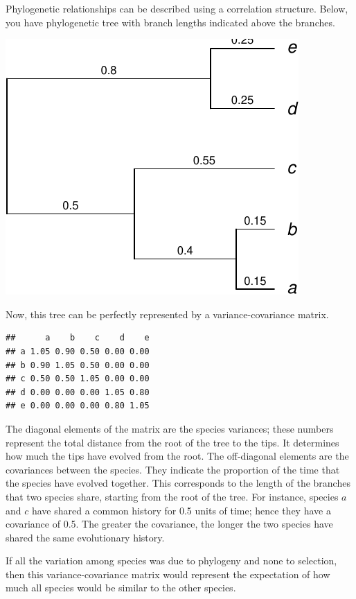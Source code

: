 \documentclass[
]{book}
\begin{document}
Phylogenetic relationships can be described using a correlation structure. Below, you have phylogenetic tree with branch lengths indicated above the branches.

\begin{flushleft}\includegraphics{pcm-workshop_files/figure-latex/phylogenetic tree example-1} \end{flushleft}

Now, this tree can be perfectly represented by a variance-covariance matrix.

\begin{verbatim}
##      a    b    c    d    e
## a 1.05 0.90 0.50 0.00 0.00
## b 0.90 1.05 0.50 0.00 0.00
## c 0.50 0.50 1.05 0.00 0.00
## d 0.00 0.00 0.00 1.05 0.80
## e 0.00 0.00 0.00 0.80 1.05
\end{verbatim}

The diagonal elements of the matrix are the species variances; these numbers represent the total distance from the root of the tree to the tips. It determines how much the tips have evolved from the root. The off-diagonal elements are the covariances between the species. They indicate the proportion of the time that the species have evolved together. This corresponds to the length of the branches that two species share, starting from the root of the tree. For instance, species \(a\) and \(c\) have shared a common history for 0.5 units of time; hence they have a covariance of 0.5. The greater the covariance, the longer the two species have shared the same evolutionary history.

If all the variation among species was due to phylogeny and none to selection, then this variance-covariance matrix would represent the expectation of how much all species would be similar to the other species.
\end{document}
